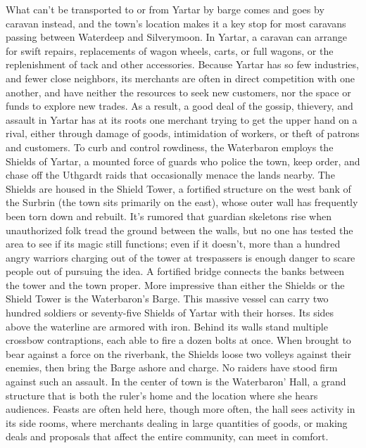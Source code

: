 \documentclass[10pt,a4paper,twoside,twocolumn,openany,bg=print,nodeprecatedcode]{dndbook}
\begin{document}
What can't be transported to or from Yartar by barge comes and goes by caravan instead, and the town's location makes it a key stop for most caravans passing between Waterdeep and Silverymoon. In Yartar, a caravan can arrange for swift repairs, replacements of wagon wheels, carts, or full wagons, or the replenishment of tack and other accessories.
Because Yartar has so few industries, and fewer close neighbors, its merchants are often in direct competition with one another, and have neither the resources to seek new customers, nor the space or funds to explore new trades. As a result, a good deal of the gossip, thievery, and assault in Yartar has at its roots one merchant trying to get the upper hand on a rival, either through damage of goods, intimidation of workers, or theft of patrons and customers.
To curb and control rowdiness, the Waterbaron employs the Shields of Yartar, a mounted force of guards who police the town, keep order, and chase off the Uthgardt raids that occasionally menace the lands nearby. The Shields are housed in the Shield Tower, a fortified structure on the west bank of the Surbrin (the town sits primarily on the east), whose outer wall has frequently been torn down and rebuilt. It's rumored that guardian skeletons rise when unauthorized folk tread the ground between the walls, but no one has tested the area to see if its magic still functions; even if it doesn't, more than a hundred angry warriors charging out of the tower at trespassers is enough danger to scare people out of pursuing the idea. A fortified bridge connects the banks between the tower and the town proper.
More impressive than either the Shields or the Shield Tower is the Waterbaron's Barge. This massive vessel can carry two hundred soldiers or seventy-five Shields of Yartar with their horses. Its sides above the waterline are armored with iron. Behind its walls stand multiple crossbow contraptions, each able to fire a dozen bolts at once. When brought to bear against a force on the riverbank, the Shields loose two volleys against their enemies, then bring the Barge ashore and charge. No raiders have stood firm against such an assault.
In the center of town is the Waterbaron' Hall, a grand structure that is both the ruler's home and the location where she hears audiences. Feasts are often held here, though more often, the hall sees activity in its side rooms, where merchants dealing in large quantities of goods, or making deals and proposals that affect the entire community, can meet in comfort.
\end{document}
